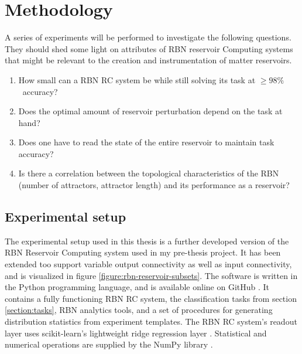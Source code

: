 \chapter{Methodology}
\label{chapter:methodology}

A series of experiments will be performed to investigate the following questions.
They should shed some light on attributes of RBN reservoir Computing systems that might be relevant to the creation and instrumentation of matter reservoirs.

\begin{enumerate}
    \item How small can a RBN RC system be while still solving its task at $ \geq 98\% $ accuracy?
    \item Does the optimal amount of reservoir perturbation depend on the task at hand?
    \item Does one have to read the state of the entire reservoir to maintain task accuracy?
    \item Is there a correlation between the topological characteristics of the RBN (number of attractors, attractor length) and its performance as a reservoir?
\end{enumerate}

\section{Experimental setup}

The experimental setup used in this thesis is a further developed version of the RBN Reservoir Computing system used in my pre-thesis project.
It has been extended too support variable output connectivity as well as input connectivity,
and is visualized in figure \ref{figure:rbn-reservoir-subsets}.
The software is written in the Python programming language,
and is available online on GitHub \cite{masters-thesis-code-github}.
It contains a fully functioning RBN RC system,
the classification tasks from section \ref{section:tasks},
RBN analytics tools,
and a set of procedures for generating distribution statistics from experiment templates.
The RBN RC system's readout layer uses scikit-learn's lightweight ridge regression layer \cite{scikit-learn}.
Statistical and numerical operations are supplied by the NumPy library \cite{van2011numpy}.

